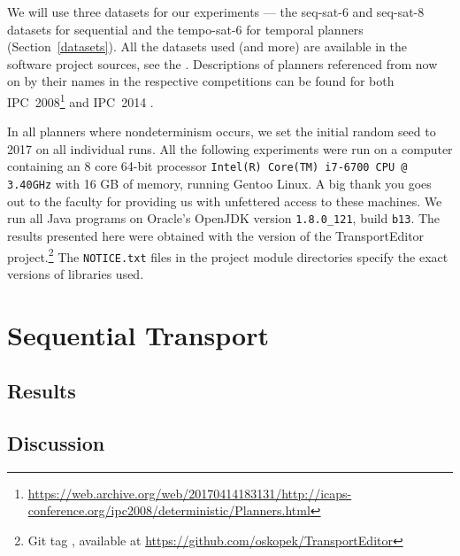 We will use three datasets for our experiments --- the seq-sat-6
and seq-sat-8 datasets for sequential
and the tempo-sat-6 for temporal planners (Section~\ref{datasets}).
All the datasets used (and more) are available in the
software project sources, see the .
Descriptions of planners referenced from now on by their names in the respective competitions can be found for both IPC~2008\footnote{\url{https://web.archive.org/web/20170414183131/http://icaps-conference.org/ipc2008/deterministic/Planners.html}} and IPC~2014 \citep{Vallati2015}.

In all planners where nondeterminism occurs,
we set the initial random seed to 2017
on all individual runs.
All the following experiments
were run on a computer
containing an 8 core 64-bit processor \texttt{Intel(R) Core(TM) i7-6700 CPU @ 3.40GHz}
with 16 GB of memory, running Gentoo Linux.
A big thank you goes out to the faculty for providing us with unfettered access to these machines.
We run all Java programs on Oracle's OpenJDK 
version \texttt{1.8.0\_121}, build \texttt{b13}.
The results presented here were obtained with the \TEver{} version of the TransportEditor project.\footnote{Git tag \TEtag{}, available at \url{https://github.com/oskopek/TransportEditor}} The \texttt{NOTICE.txt} files
in the project module directories specify
the exact versions of libraries used.



















\section{Sequential Transport}


\subsection{Results}



\subsection{Discussion}

